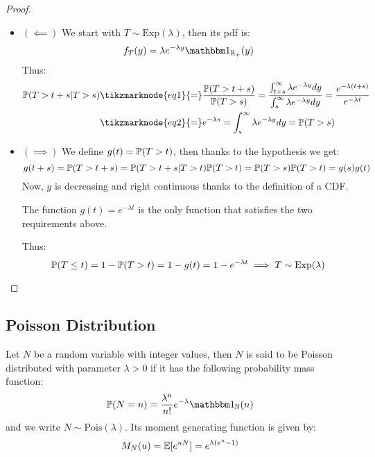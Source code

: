 \begin{proof}
$ $ \newline
\begin{itemize}
    \item $(\impliedby)$ We start with $T\sim\text{Exp}(\lambda)$, then its pdf
        is:
        \[
            f_T(y) = \lambda e^{-\lambda y} \I_{\Rpos}(y)
        \]
        Thus:
        \begin{align*}
            \P(T>t+s | T>s) & \tikzmarknode{eq1}{=}
                \frac{\P(T>t+s)}{\P(T>s)}
                = \frac{\int^\infty_{t+s} \lambda e^{-\lambda y} dy}
                {\int^\infty_s \lambda e^{-\lambda y} dy} 
                = \frac{e^{-\lambda(t+s)}}{e^{-\lambda t}}\\
                & \tikzmarknode{eq2}{=} e^{-\lambda s} =
                \int^\infty_s \lambda e^{-\lambda y} dy = \P(T>s)
        \end{align*} 
    \item $(\implies)$ We define $g(t) = \P(T>t)$, then thanks to the hypothesis
        we get:
        \[
            g(t+s) = \P(T>t+s) = \P(T>t+s|T>t)\P(T>t) =
            \P(T>s) \P(T>t) = g(s)g(t)
        \]
        Now, $g$ is decreasing and right continuous thanks to the definition of
        a CDF.
        \begin{theorem*}
            The function $g(t)=e^{-\lambda t}$ is the only function that
            satisfies the two requirements above. 
        \end{theorem*}
        Thus:
        \[
            \P(T\leq t) = 1 - \P(T>t) = 1 - g(t) = 1 - e^{-\lambda t}
            \implies T\sim\text{Exp}(\lambda)
        \]
\end{itemize}
\end{proof}

\subsection{Poisson Distribution}
Let $N$ be a random variable with integer values, then $N$ is said to be
Poisson distributed with parameter $\lambda > 0$ if it has the following
probability mass function:
\[
    \P(N=n) = \frac{\lambda^n}{n!} e^{-\lambda} \I_{\N}(n)
\]
and we write $N\sim\text{Pois}(\lambda)$.
Its moment generating function is given by:
\[
    M_N(u) = \E[e^{uN}] = e^{\lambda(e^u-1)}
\]

